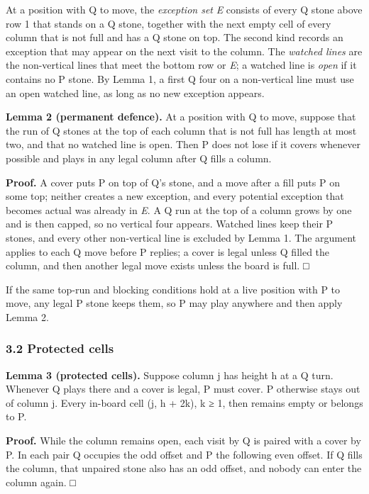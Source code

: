 \documentclass[
  a4paper,
]{article}
\begin{document}
At a position with Q to move, the \emph{exception set} \emph{E} consists
of every Q stone above row 1 that stands on a Q stone, together with the
next empty cell of every column that is not full and has a Q stone on
top. The second kind records an exception that may appear on the next
visit to the column. The \emph{watched lines} are the non-vertical lines
that meet the bottom row or \emph{E}; a watched line is \emph{open} if
it contains no P stone. By Lemma 1, a first Q four on a non-vertical
line must use an open watched line, as long as no new exception appears.

\textbf{Lemma 2 (permanent defence).} At a position with Q to move,
suppose that the run of Q stones at the top of each column that is not
full has length at most two, and that no watched line is open. Then P
does not lose if it covers whenever possible and plays in any legal
column after Q fills a column.

\textbf{Proof.} A cover puts P on top of Q's stone, and a move after a
fill puts P on some top; neither creates a new exception, and every
potential exception that becomes actual was already in \emph{E}. A Q run
at the top of a column grows by one and is then capped, so no vertical
four appears. Watched lines keep their P stones, and every other
non-vertical line is excluded by Lemma 1. The argument applies to each Q
move before P replies; a cover is legal unless Q filled the column, and
then another legal move exists unless the board is full. □

If the same top-run and blocking conditions hold at a live position with
P to move, any legal P stone keeps them, so P may play anywhere and then
apply Lemma 2.

\subsubsection{3.2 Protected cells}\label{protected-cells}

\textbf{Lemma 3 (protected cells).} Suppose column j has height h at a Q
turn. Whenever Q plays there and a cover is legal, P must cover. P
otherwise stays out of column j. Every in-board cell (j, h + 2k), k ≥ 1,
then remains empty or belongs to P.

\textbf{Proof.} While the column remains open, each visit by Q is paired
with a cover by P. In each pair Q occupies the odd offset and P the
following even offset. If Q fills the column, that unpaired stone also
has an odd offset, and nobody can enter the column again. □
\end{document}
